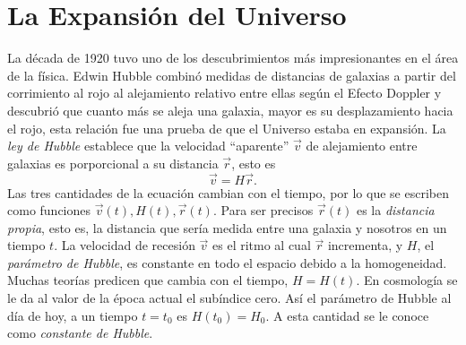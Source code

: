 \documentclass[a4paper,openright,10pt, oneside, final]{book}
\begin{document}
\section{La Expansión del Universo}
La década de 1920 tuvo uno de los descubrimientos más impresionantes en el área de la física. Edwin Hubble combinó medidas de distancias de galaxias a partir del corrimiento al rojo al alejamiento relativo entre ellas según el Efecto Doppler y  descubrió que cuanto más se aleja una galaxia, mayor es su desplazamiento hacia el rojo, esta relación fue una prueba de que el Universo estaba en expansión. La \textit{ley de Hubble} \cite{1.1} establece que la velocidad ``aparente'' $\vec{v}$ de alejamiento entre galaxias es porporcional a su distancia $\vec{r}$, esto es
\begin{equation}
\vec{v} = H\vec{r}.\label{eqn 1.1}
\end{equation}
Las tres cantidades de la ecuación cambian con el tiempo, por lo que se escriben como funciones $\vec{v}(t), H(t), \vec{r}(t)$. Para ser precisos $\vec{r}(t)$ es la \textit{distancia propia}, esto es, la distancia que sería medida entre una galaxia y nosotros en un tiempo $t$. La velocidad de recesión $\vec{v}$ es el ritmo al cual $\vec{r}$ incrementa, y $H$, el \textit{parámetro de Hubble}, es constante en todo el espacio debido a la homogeneidad. Muchas teorías predicen que cambia con el tiempo, $H = H(t)$. En cosmología se le da al valor de la época actual el subíndice cero. Así el parámetro de Hubble al día de hoy, a un tiempo $t= t_{0}$ es $H(t_{0})= H_{0}$. A esta cantidad se le conoce como \textit{constante de Hubble}.
\end{document}
